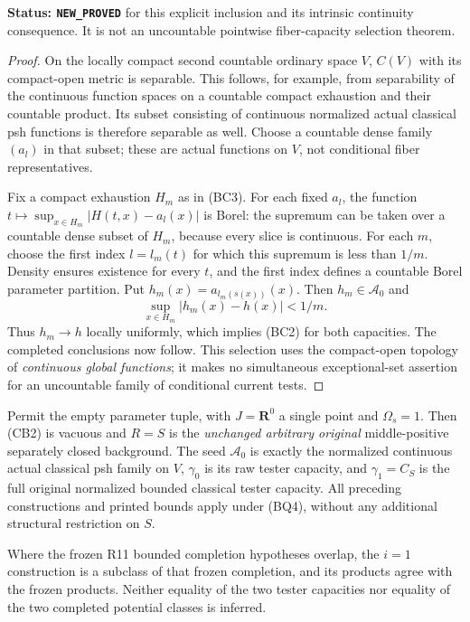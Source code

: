\noindent\textbf{Status: \texttt{NEW\_PROVED}} for this explicit
inclusion and its intrinsic continuity consequence. It is not an
uncountable pointwise fiber-capacity selection theorem.

\begin{proof}
On the locally compact second countable ordinary space $V$,
$C(V)$ with its compact-open metric is separable. This follows,
for example, from separability of the continuous function spaces
on a countable compact exhaustion and their countable product.
Its subset consisting of continuous normalized actual classical
psh functions is therefore separable as well. Choose a countable
dense family $(a_l)$ in that subset; these are actual functions
on $V$, not conditional fiber representatives.

Fix a compact exhaustion $H_m$ as in (BC3). For each fixed
$a_l$, the function
$t\mapsto\sup_{x\in H_m}|H(t,x)-a_l(x)|$ is Borel:
the supremum can be taken over a countable dense subset of
$H_m$, because every slice is continuous. For each $m$, choose
the first index $l=l_m(t)$ for which this supremum is less than
$1/m$. Density ensures existence for every $t$, and the first
index defines a countable Borel parameter partition. Put
$h_m(x)=a_{l_m(s(x))}(x)$. Then $h_m\in\mathcal A_0$ and
\[
                     \sup_{x\in H_m}|h_m(x)-h(x)|<1/m.
\]
Thus $h_m\to h$ locally uniformly, which implies (BC2) for
both capacities. The completed conclusions now follow. This
selection uses the compact-open topology of \emph{continuous
global functions}; it makes no simultaneous exceptional-set
assertion for an uncountable family of conditional current tests.
\end{proof}

\begin{corollary}
\label{cor:r12-empty-parameter-completion}
Permit the empty parameter tuple, with $J=\mathbf R^0$ a single
point and $\Omega_s=1$. Then (CB2) is vacuous and $R=S$ is
the \emph{unchanged arbitrary original} middle-positive separately
closed background. The seed $\mathcal A_0$ is exactly the
normalized continuous actual classical psh family on $V$,
$\gamma_0$ is its raw tester capacity, and $\gamma_1=C_S$ is
the full original normalized bounded classical tester capacity.
All preceding constructions and printed bounds apply under
(BQ4), without any additional structural restriction on $S$.

Where the frozen R11 bounded completion hypotheses overlap,
the $i=1$ construction is a subclass of that frozen completion,
and its products agree with the frozen products. Neither equality
of the two tester capacities nor equality of the two completed
potential classes is inferred.
\end{corollary}

